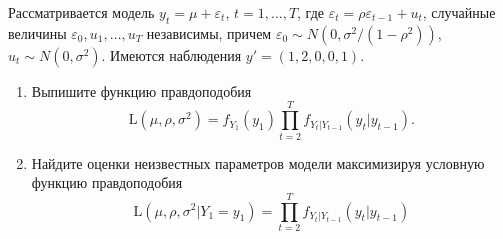 \begin{problem}
Рассматривается модель $y_t = \mu + \varepsilon_t$, $t = 1,\ldots,T$, где $\varepsilon_t = \rho \varepsilon_{t-1} + u_t$, случайные величины $\varepsilon_0, u_1,\dots,u_T$ независимы, причем $\varepsilon_0 \sim N(0,\sigma^2/(1 - \rho^2))$, $u_t \sim N(0,\sigma^2)$. Имеются наблюдения $y' = (1, 2, 0, 0, 1)$.
\begin{enumerate}
  \item Выпишите функцию правдоподобия 
  \[
  \mathrm{L}(\mu, \rho, \sigma^2) = f_{Y_1}(y_1)\prod_{t=2}^{T}f_{Y_t|Y_{t-1}}(y_t|y_{t-1}).
  \]
  \item Найдите оценки неизвестных параметров модели максимизируя условную функцию правдоподобия 
  \[
  \mathrm{L}(\mu, \rho, \sigma^2|Y_1 = y_1) = \prod_{t=2}^{T}f_{Y_t|Y_{t-1}}(y_t|y_{t-1})
  \] 
\end{enumerate}
\end{problem}

